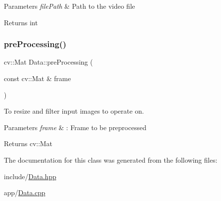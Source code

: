 \begin{DoxyParams}{Parameters}
{\em file\+Path} & Path to the video file \\
\hline
\end{DoxyParams}
\begin{DoxyReturn}{Returns}
int 
\end{DoxyReturn}
\mbox{\label{classData_a8791dd62b1f57b4e4f2039e934ec7fdf}} 
\subsubsection{\texorpdfstring{pre\+Processing()}{preProcessing()}}
{\footnotesize\ttfamily cv\+::\+Mat Data\+::pre\+Processing (\begin{DoxyParamCaption}\item[{const cv\+::\+Mat \&}]{frame }\end{DoxyParamCaption})}



To resize and filter input images to operate on. 


\begin{DoxyParams}{Parameters}
{\em frame} & \+: Frame to be preprocessed \\
\hline
\end{DoxyParams}
\begin{DoxyReturn}{Returns}
cv\+::\+Mat 
\end{DoxyReturn}


The documentation for this class was generated from the following files\+:\begin{DoxyCompactItemize}
\item 
include/\hyperlink{Data_8hpp}{Data.\+hpp}\item 
app/\hyperlink{Data_8cpp}{Data.\+cpp}\end{DoxyCompactItemize}
